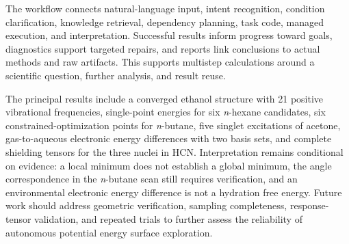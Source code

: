 The workflow connects natural-language input, intent recognition, condition clarification,
knowledge retrieval, dependency planning, task code, managed execution, and interpretation.
Successful results inform progress toward goals, diagnostics support targeted repairs,
and reports link conclusions to actual methods and raw artifacts.
This supports multistep calculations around a scientific question, further analysis, and result reuse.

The principal results include a converged ethanol structure with 21 positive vibrational frequencies,
single-point energies for six \textit{n}-hexane candidates, six constrained-optimization points for \textit{n}-butane,
five singlet excitations of acetone, gas-to-aqueous electronic energy differences with two basis sets,
and complete shielding tensors for the three nuclei in HCN.
Interpretation remains conditional on evidence:
a local minimum does not establish a global minimum, the angle correspondence in the \textit{n}-butane scan still requires verification,
and an environmental electronic energy difference is not a hydration free energy.
Future work should address geometric verification, sampling completeness, response-tensor validation,
and repeated trials to further assess the reliability of autonomous potential energy surface exploration.
